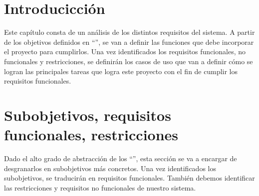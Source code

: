 \section{Introducicción}
\begin{text}
	Este capítulo consta de un análisis de los distintos requisitos del sistema. A partir de los objetivos definidos en ``'', se van a definir las funciones que debe incorporar el proyecto para cumplirlos. Una vez identificados los requisitos funcionales, no funcionales y restricciones, se definirán los casos de uso que van a definir cómo se logran las principales tareas que logra este proyecto con el fin de cumplir los requisitos funcionales.
	
\end{text}
\section{Subobjetivos, requisitos funcionales, restricciones}
	\begin{text}
		Dado el alto grado de abstracción de los ``'', esta sección se va a encargar de desgranarlos en subobjetivos más concretos. Una vez identificados los subobjetivos, se traducirán en requisitos funcionales. También debemos identificar las restricciones y requisitos no funcionales de nuestro sistema.
	\end{text}

